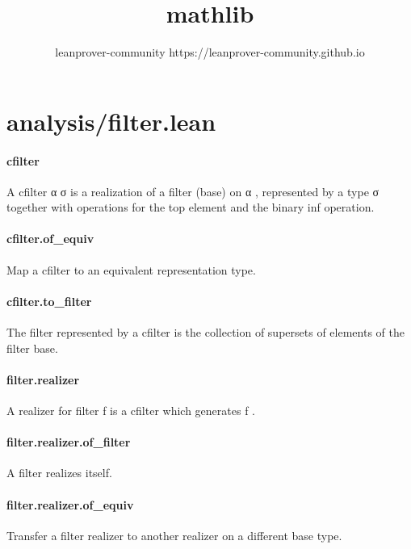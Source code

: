 \documentclass{article}
\author{leanprover-community https://leanprover-community.github.io}
\title{mathlib}
\begin{document}
    \maketitle
    \clearpage
    \tableofcontents
    \clearpage
    \setmainfont[
         BoldFont={STIX2Text-Bold.otf},
         ItalicFont={STIX2Text-Italic.otf},
         BoldItalicFont={STIX2Text-BoldItalic.otf}
    ]
    {STIX2Text-Regular.otf}
    \section{analysis/filter.lean}\paragraph{cfilter}
\par
A 
\colorbox[RGB]{253,246,227}{{{{\color[RGB]{101, 123, 131} cfilter α σ }}}} is a realization of a filter (base) on 
\colorbox[RGB]{253,246,227}{{{{\color[RGB]{101, 123, 131} α }}}},
represented by a type 
\colorbox[RGB]{253,246,227}{{{{\color[RGB]{101, 123, 131} σ }}}} together with operations for the top element and
the binary inf operation.
\paragraph{cfilter.of\_equiv}
\par
Map a cfilter to an equivalent representation type.
\paragraph{cfilter.to\_filter}
\par
The filter represented by a 
\colorbox[RGB]{253,246,227}{{{{\color[RGB]{101, 123, 131} cfilter }}}} is the collection of supersets of
elements of the filter base.
\paragraph{filter.realizer}
\par
A realizer for filter 
\colorbox[RGB]{253,246,227}{{{{\color[RGB]{101, 123, 131} f }}}} is a cfilter which generates 
\colorbox[RGB]{253,246,227}{{{{\color[RGB]{101, 123, 131} f }}}}.
\paragraph{filter.realizer.of\_filter}
\par
A filter realizes itself.
\paragraph{filter.realizer.of\_equiv}
\par
Transfer a filter realizer to another realizer on a different base type.
\end{document}
